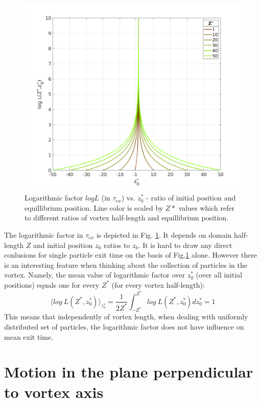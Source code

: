\documentclass[../main.tex]{subfiles}
\begin{document}
\begin{figure}
\centering
\noindent \includegraphics[width=30pc]{gfx/Z_log_factor_plot.png}
\caption{Logarithmic factor $logL$ (in $\tau_{ex}$) vs. $z^*_0$ - ratio of initial position and equillibrium position. Line color is scaled by $Z*$ values which refer to different ratios of vortex half-length and equillibrium position.}
\label{fig:ch3_2}
\end{figure}

The logarithmic factor in $\tau_{ex}$ is depicted in Fig. \ref{fig:ch3_2}. It depends on domain half-length $Z$ and initial position $z_0$ ratios to $z_b$. It is hard to draw any direct conlusions for single particle exit time on the basis of Fig.\ref{fig:ch3_2} alone. However there is an interesting feature when thinking about the collection of particles in the vortex. Namely, the mean value of logarithmic factor over $z_0^\ast$ (over all initial positions) equals one for every $Z^\ast$ (for every vortex half-length):
\begin{equation}
\langle log\ L(Z^\ast,z_0^\ast)\rangle_{z_0^\ast}=\frac{1}{2 Z^\ast}\int_{-Z^\ast}^{Z^\ast}log\ L(Z^\ast,z_0^\ast)dz_0^\ast=1
\label{ch3:eq15}
\end{equation}
This means that independently of vortex length, when dealing with uniformly distributed set of particles, the logarithmic factor does not have influence on mean exit time.

\section{Motion in the plane perpendicular to vortex axis}
\end{document}
